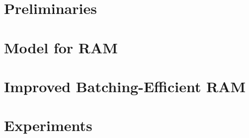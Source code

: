 \documentclass[sigconf]{acmart}
\begin{document}
\section{Preliminaries}\label{sec:prelims}
    

\section{Model for RAM}\label{sec:model-for-ram}


\section{Improved Batching-Efficient RAM}\label{sec:batch-efficient-ram}


\section{Experiments}\label{sec:experiments}




\appendix

\end{document}
